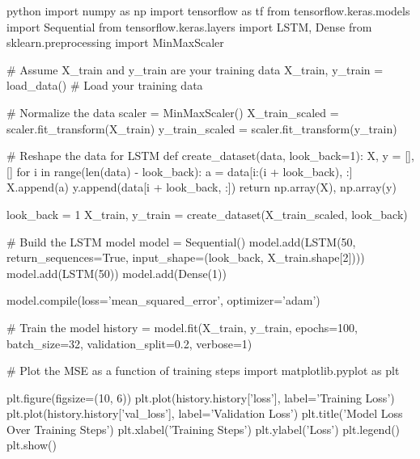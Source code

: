 python
import numpy as np
import tensorflow as tf
from tensorflow.keras.models import Sequential
from tensorflow.keras.layers import LSTM, Dense
from sklearn.preprocessing import MinMaxScaler

# Assume X_train and y_train are your training data
X_train, y_train = load_data()  # Load your training data

# Normalize the data
scaler = MinMaxScaler()
X_train_scaled = scaler.fit_transform(X_train)
y_train_scaled = scaler.fit_transform(y_train)

# Reshape the data for LSTM
def create_dataset(data, look_back=1):
    X, y = [], []
    for i in range(len(data) - look_back):
        a = data[i:(i + look_back), :]
        X.append(a)
        y.append(data[i + look_back, :])
    return np.array(X), np.array(y)

look_back = 1
X_train, y_train = create_dataset(X_train_scaled, look_back)

# Build the LSTM model
model = Sequential()
model.add(LSTM(50, return_sequences=True, input_shape=(look_back, X_train.shape[2])))
model.add(LSTM(50))
model.add(Dense(1))

model.compile(loss='mean_squared_error', optimizer='adam')

# Train the model
history = model.fit(X_train, y_train, epochs=100, batch_size=32, validation_split=0.2, verbose=1)

# Plot the MSE as a function of training steps
import matplotlib.pyplot as plt

plt.figure(figsize=(10, 6))
plt.plot(history.history['loss'], label='Training Loss')
plt.plot(history.history['val_loss'], label='Validation Loss')
plt.title('Model Loss Over Training Steps')
plt.xlabel('Training Steps')
plt.ylabel('Loss')
plt.legend()
plt.show()